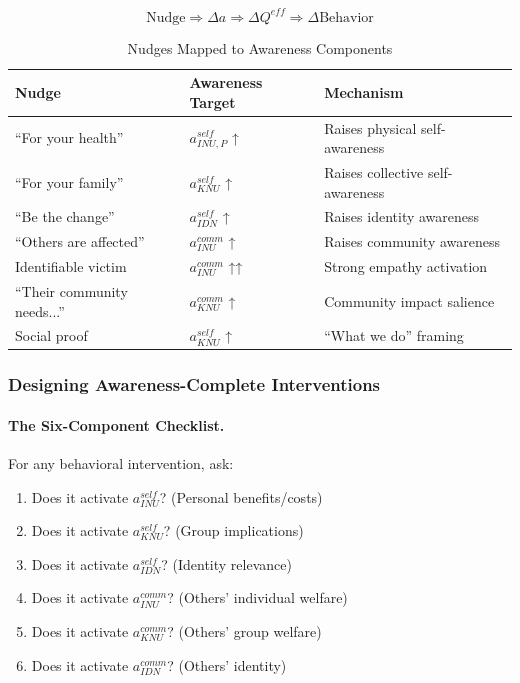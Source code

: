 \begin{equation}
\text{Nudge} \Rightarrow \Delta a \Rightarrow \Delta Q^{eff} \Rightarrow \Delta \text{Behavior}
\end{equation}

\begin{table}[htbp]
\centering
\caption{Nudges Mapped to Awareness Components}
\label{tab:nudges-awareness-map}
\renewcommand{\arraystretch}{1.3}
\begin{tabular}{@{}lll@{}}
\toprule
\textbf{Nudge} & \textbf{Awareness Target} & \textbf{Mechanism} \\
\midrule
``For your health'' & $a^{self}_{INU,P}$ ↑ & Raises physical self-awareness \\
``For your family'' & $a^{self}_{KNU}$ ↑ & Raises collective self-awareness \\
``Be the change'' & $a^{self}_{IDN}$ ↑ & Raises identity awareness \\
``Others are affected'' & $a^{comm}_{INU}$ ↑ & Raises community awareness \\
Identifiable victim & $a^{comm}_{INU}$ ↑↑ & Strong empathy activation \\
``Their community needs...'' & $a^{comm}_{KNU}$ ↑ & Community impact salience \\
Social proof & $a^{self}_{KNU}$ ↑ & ``What we do'' framing \\
\bottomrule
\end{tabular}
\end{table}

\subsubsection{Designing Awareness-Complete Interventions}

\paragraph{The Six-Component Checklist.}
For any behavioral intervention, ask:

\begin{enumerate}
\item Does it activate $a^{self}_{INU}$? (Personal benefits/costs)
\item Does it activate $a^{self}_{KNU}$? (Group implications)
\item Does it activate $a^{self}_{IDN}$? (Identity relevance)
\item Does it activate $a^{comm}_{INU}$? (Others' individual welfare)
\item Does it activate $a^{comm}_{KNU}$? (Others' group welfare)
\item Does it activate $a^{comm}_{IDN}$? (Others' identity)
\end{enumerate}

